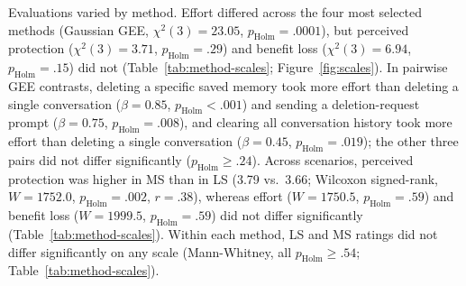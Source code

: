     Evaluations varied by method.
    Effort differed across the four most selected methods (Gaussian GEE, $\chi^2(3)=23.05$, $p_{\mathrm{Holm}}=.0001$), but perceived protection ($\chi^2(3)=3.71$, $p_{\mathrm{Holm}}=.29$) and benefit loss ($\chi^2(3)=6.94$, $p_{\mathrm{Holm}}=.15$) did not (Table~\ref{tab:method-scales}; Figure~\ref{fig:scales}).
    In pairwise GEE contrasts, deleting a specific saved memory took more effort than deleting a single conversation ($\beta=0.85$, $p_{\mathrm{Holm}}<.001$) and sending a deletion-request prompt ($\beta=0.75$, $p_{\mathrm{Holm}}=.008$), and clearing all conversation history took more effort than deleting a single conversation ($\beta=0.45$, $p_{\mathrm{Holm}}=.019$); the other three pairs did not differ significantly ($p_{\mathrm{Holm}}\geq.24$).
    Across scenarios, perceived protection was higher in MS than in LS (3.79 vs.\ 3.66; Wilcoxon signed-rank, $W=1752.0$, $p_{\mathrm{Holm}}=.002$, $r=.38$), whereas effort ($W=1750.5$, $p_{\mathrm{Holm}}=.59$) and benefit loss ($W=1999.5$, $p_{\mathrm{Holm}}=.59$) did not differ significantly (Table~\ref{tab:method-scales}).
    Within each method, LS and MS ratings did not differ significantly on any scale (Mann-Whitney, all $p_{\mathrm{Holm}}\geq.54$; Table~\ref{tab:method-scales}).



